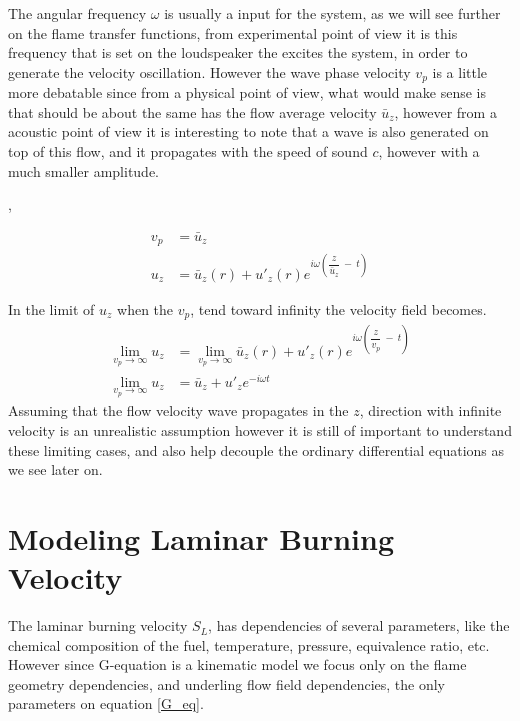 The angular frequency $\omega$ is usually a input for the system, as we will see further on the flame transfer functions, from experimental point of view it is this frequency that is set on the loudspeaker the excites the system, in order to generate the velocity oscillation. 
However the wave phase velocity $v_p$ is a little more debatable since from a physical point of view, what would make sense is that should be about the same has the flow average velocity $\bar{u}_z$, however from a acoustic point of view it is interesting to note that a wave is also generated on top of this flow, and it propagates with the speed of sound $c$, however with a much smaller amplitude.

 \cite{schuller_2002}, \cite{baillot_1992}


\begin{assumption}
\begin{align}
	v_p&=\bar{u}_z\\
	u_z&=\bar{u}_z(r) + u'_z(r)e^{i\omega\left(\dfrac{z}{\bar{u}_z}\ -\ t\right)}
\end{align}
\label{u_avg_ass}
\end{assumption}

\begin{assumption}
In the limit of $u_z$ when the $v_p$, tend toward infinity the velocity field becomes.
\begin{align}
	\lim_{v_p \to \infty}u_z&=\lim_{v_p \to \infty}\bar{u}_z(r) + u'_z(r)e^{i\omega\left(\dfrac{z}{v_p}\ -\ t\right)}\nonumber \\
	\lim_{v_p \to \infty}u_z&=\bar{u}_z + u'_z e^{-i\omega t}
\end{align}
Assuming that the flow velocity wave propagates in the $z$, direction with infinite velocity is an unrealistic assumption however it is still of important to understand these limiting cases, and also help decouple the ordinary differential equations as we see later on.
\label{u_inf_ass}
\end{assumption}












\newpage
\section{Modeling Laminar Burning Velocity}
The laminar burning velocity $S_L$, has dependencies of several parameters, like the chemical composition of the fuel, temperature, pressure, equivalence ratio, etc. However since G-equation is a kinematic model we focus only on the flame geometry dependencies, and underling flow field dependencies, the only parameters on equation \eqref{G_eq}.

